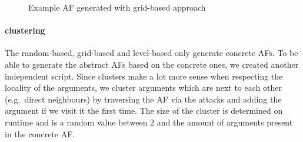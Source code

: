 \begin{figure}[h]
\begin{subfigure}[t]{0.45\textwidth}
    \label{af:ImplementationLevelBasedExampleAFsb}
\end{subfigure}%
\caption{Example AF generated with grid-based approach}
\label{fig:ImplementationLevelBasedExampleAFs}
\end{figure}

\paragraph{clustering} The random-based, grid-based and level-based only generate concrete AFs. To be able to generate the abstract AFs based on the concrete ones, we created another independent script. Since clusters make a lot more sense when respecting the locality of the arguments, we cluster arguments which are next to each other (e.g.\ direct neighbours) by traversing the AF via the attacks and adding the argument if we visit it the first time. The size of the cluster is determined on runtime and is a random value between $2$ and the amount of arguments present in the concrete AF.





